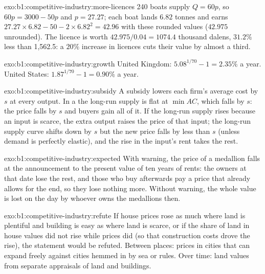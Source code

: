 \begin{solution}{exo:b1:competitive-industry:more-licences}
240 boats supply $Q = 60p$, so $60p = 3000 - 50p$ and $p = 27.27$; each boat lands
$6.82$ tonnes and earns $27.27 \times 6.82 - 50 - 2 \times 6.82^2 = 42.96$ with these rounded
values ($42.975$ unrounded). The licence is worth $42.975/0.04 = 1074.4$ thousand dalens,
$31.2\%$ less than 1,562.5: a $20\%$ increase in licences cuts their value by
almost a third.
\end{solution}

\begin{solution}{exo:b1:competitive-industry:growth}
United Kingdom: $5.08^{1/70} - 1 = 2.35\%$ a year. United States:
$1.87^{1/70} - 1 = 0.90\%$ a year.
\end{solution}

\begin{solution}{exo:b1:competitive-industry:subsidy}
A subsidy lowers each firm's average cost by $s$ at every output. In a
 the long-run supply is flat at $\min AC$, which
falls by $s$: the price falls by $s$ and buyers gain all of it. If the
long-run supply rises because an input is scarce, the extra output raises
the price of that input; the long-run supply curve shifts down by $s$ but the
new price falls by less than $s$ (unless demand is perfectly elastic), and
the rise in the input's rent takes the rest.
\end{solution}

\begin{solution}{exo:b1:competitive-industry:expected}
With warning, the price of a medallion falls at the announcement to the
present value of ten years of rents: the owners at that date lose the
rest, and those who buy afterwards pay a price that already allows for the
end, so they lose nothing more. Without warning, the whole value is lost
on the day by whoever owns the medallions then.
\end{solution}

\begin{solution}{exo:b1:competitive-industry:refute}
If house prices rose as much where land is plentiful and building is easy
as where land is scarce, or if the share of land in house values did not
rise while prices did (so that construction costs drove the rise), the
statement would be refuted. Between places: prices in cities that can
expand freely against cities hemmed in by sea or rules. Over time: land
values from separate appraisals of land and buildings.
\end{solution}

